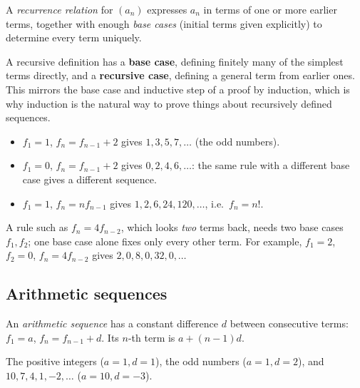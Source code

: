 \begin{definition}
A \emph{recurrence relation} for $(a_n)$ expresses $a_n$ in terms of one or more earlier terms, together with enough \emph{base cases} (initial terms given explicitly) to determine every term uniquely.
\end{definition}

\begin{note}
A recursive definition has a \textbf{base case}, defining finitely many of the simplest terms directly, and a \textbf{recursive case}, defining a general term from earlier ones. This mirrors the base case and inductive step of a proof by induction, which is why induction is the natural way to prove things about recursively defined sequences.
\end{note}

\begin{example}
\begin{itemize}
    \item $f_1=1$, $f_n=f_{n-1}+2$ gives $1,3,5,7,\dots$ (the odd numbers).
    \item $f_1=0$, $f_n=f_{n-1}+2$ gives $0,2,4,6,\dots$: the same rule with a different base case gives a different sequence.
    \item $f_1=1$, $f_n=nf_{n-1}$ gives $1,2,6,24,120,\dots$, i.e.\ $f_n=n!$.
\end{itemize}
\end{example}

\begin{note}
A rule such as $f_n=4f_{n-2}$, which looks \emph{two} terms back, needs two base cases $f_1,f_2$; one base case alone fixes only every other term. For example, $f_1=2$, $f_2=0$, $f_n=4f_{n-2}$ gives $2,0,8,0,32,0,\dots$
\end{note}

\subsection{Arithmetic sequences}
\label{sec:6-3}

\begin{definition}
An \emph{arithmetic sequence} has a constant difference $d$ between consecutive terms: $f_1=a$, $f_n=f_{n-1}+d$. Its $n$-th term is $a+(n-1)d$.
\end{definition}

\begin{example}
The positive integers ($a=1,d=1$), the odd numbers ($a=1,d=2$), and $10,7,4,1,-2,\dots$ ($a=10,d=-3$).
\end{example}

